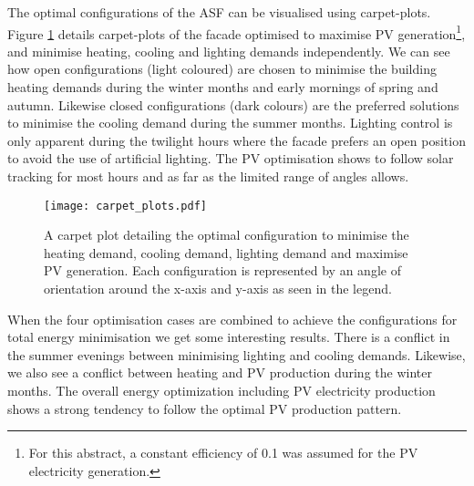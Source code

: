 


The optimal configurations of the ASF can be visualised using carpet-plots. Figure \ref{fig:carpetplot} details carpet-plots of the facade optimised to maximise PV generation\footnote{For this abstract, a constant efficiency of 0.1 was assumed for the PV electricity generation.}, and minimise heating, cooling and lighting demands independently. We can see how open configurations (light coloured) are chosen to minimise the building heating demands during the winter months and early mornings of spring and autumn. Likewise closed configurations (dark colours) are the preferred solutions to minimise the cooling demand during the summer months. Lighting control is only apparent during the twilight hours where the facade prefers an open position to avoid the use of artificial lighting. The PV optimisation shows to follow solar tracking for most hours and as far as the limited range of angles allows. 

\begin{figure}
\begin{center}
\texttt{[image: carpet\_plots.pdf]}
\caption{A carpet plot detailing the optimal configuration to minimise the heating demand, cooling demand, lighting demand and maximise PV generation. Each configuration is represented by an angle of orientation around the x-axis and y-axis as seen in the legend.}
\label{fig:carpetplot}
\end{center}
\end{figure}

When the four optimisation cases are combined to achieve the configurations for total energy minimisation we get some interesting results. There is a conflict in the summer evenings between minimising lighting and cooling demands. Likewise, we also see a conflict between heating and PV production during the winter months. The overall energy optimization including PV electricity production shows a strong tendency to follow the optimal PV production pattern. 

